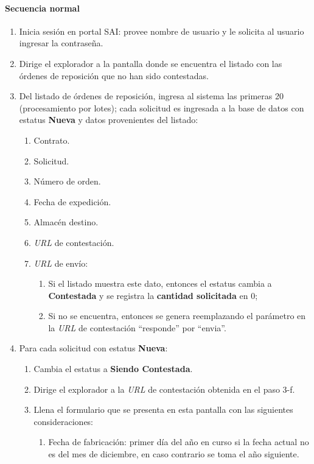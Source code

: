 \paragraph{Secuencia normal}
\begin{enumerate}
  \item Inicia sesión en portal SAI: provee nombre de usuario y le solicita al usuario ingresar la contraseña.
  \item Dirige el explorador a la pantalla donde se encuentra el listado con las órdenes de reposición que no han sido contestadas.
  \item Del listado de órdenes de reposición, ingresa al sistema las primeras 20 (procesamiento por lotes); cada solicitud es ingresada a la base de datos con estatus \textbf{Nueva} y datos provenientes del listado:
  \begin{enumerate}
    \item Contrato.
    \item Solicitud.
    \item Número de orden.
    \item Fecha de expedición.
    \item Almacén destino.
    \item \textit{URL} de contestación.
    \item \textit{URL} de envío:
    \begin{enumerate}
      \item Si el listado muestra este dato, entonces el estatus cambia a \textbf{Contestada} y se registra la \textbf{cantidad solicitada} en 0;
      \item Si no se encuentra, entonces se genera reemplazando el parámetro en la \textit{URL} de contestación ``responde'' por ``envia''.
    \end{enumerate}
  \end{enumerate}
  \item Para cada solicitud con estatus \textbf{Nueva}:
  \begin{enumerate}
    \item Cambia el estatus a \textbf{Siendo Contestada}.
    \item Dirige el explorador a la \textit{URL} de contestación obtenida en el paso 3-f.
    \item Llena el formulario que se presenta en esta pantalla con las siguientes consideraciones:
    \begin{enumerate}
      \item Fecha de fabricación: primer día del año en curso si la fecha actual no es del mes de diciembre, en caso contrario se toma el año siguiente.

\end{enumerate}
\end{enumerate}
\end{enumerate}
